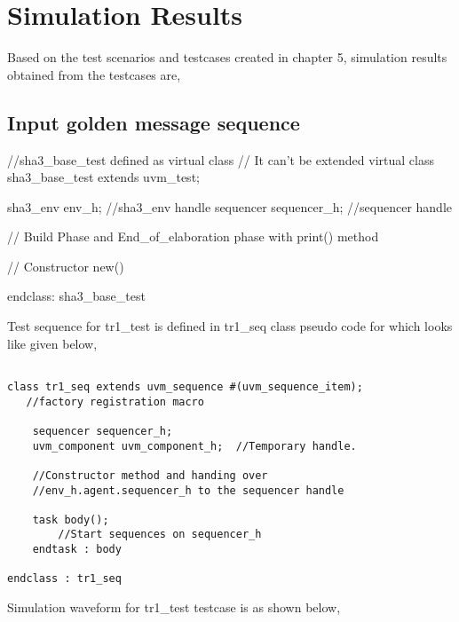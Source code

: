 \chapter{Simulation Results}

Based on the test scenarios and testcases created in chapter 5, simulation results obtained from the testcases are,

\section{Input golden message sequence}

\begin{tcolorbox}

	\begin{verbbox}
	
//sha3_base_test defined as virtual class
// It can't be extended
virtual class sha3_base_test extends uvm_test;

	sha3_env env_h;		//sha3_env handle
	sequencer sequencer_h;	//sequencer handle
	
	// Build Phase and End_of_elaboration phase with print() method

	// Constructor new()
	
endclass: sha3_base_test
	\end{verbbox}
	\resizebox{0.95\textwidth}{!}{\theverbbox}
	
\end{tcolorbox}

Test sequence for tr1\_test is defined in tr1\_seq class pseudo code for which looks like given below,


\begin{tcolorbox}

	\begin{verbatim}
	
class tr1_seq extends uvm_sequence #(uvm_sequence_item);
   //factory registration macro

	sequencer sequencer_h;
	uvm_component uvm_component_h;	//Temporary handle.
	
	//Constructor method and handing over 
	//env_h.agent.sequencer_h to the sequencer handle

	task body();
		//Start	sequences on sequencer_h
	endtask : body

endclass : tr1_seq
	\end{verbatim}
	
\end{tcolorbox}

Simulation waveform for tr1\_test testcase is as shown below,

